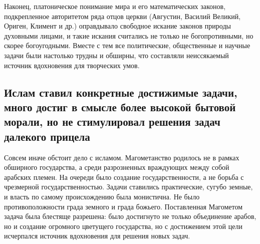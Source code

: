 Наконец, платоническое  понимание мира  и его  математических законов,
подкрепленное  авторитетом   ряда  отцов  церкви   (Августин,  Василий
Великий, Ориген, Климент и  др.) оправдывало свободное искание законов
природы  духовными лицами,  и  такие искания  считались  не только  не
богопротивными, но скорее богоугодными. Вместе с тем все политические,
общественные и  научные задачи  были настолько  трудны и  обширны, что
составляли неиссякаемый источник вдохновения для творческих умов.

\subsection{Ислам ставил конкретные достижимые  задачи, много достиг в
смысле более высокой бытовой морали,  но не стимулировал решения задач
далекого прицела}

Совсем  иначе обстоит  дело  с исламом.  Магометанство  родилось не  в
рамках обширного  государства, а  среди разрозненных  враждующих между
собой  арабских племен.  На очереди  было создание  государственности,
а  не   борьба  с  чрезмерной  государственностью.   Задачи  ставились
практические,  сугубо   земные,  и  власть  по   самому  происхождению
была  монистична.  Не было  противоположности  града  земного и  града
божьего. Поставленная  Магометом задача была блестяще  разрешена: было
достигнуто  не  только объединение  арабов,  но  и создание  огромного
цветущего государства, но с  достижением этой цели исчерпался источник
вдохновения для решения новых задач.

